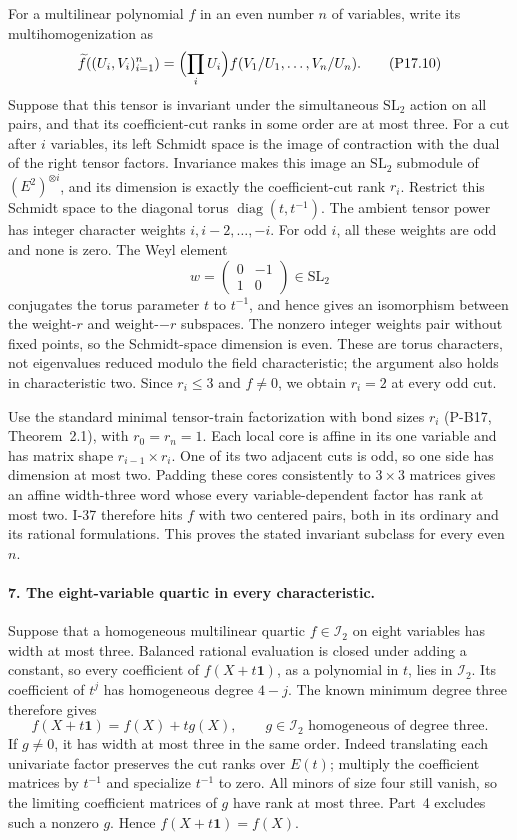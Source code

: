 For a multilinear polynomial $f$ in an even number $n$ of variables,
write its multihomogenization as
\[
 \widetilde f((U_i,V_i)_{i=1}^n)
   =\Bigl(\prod_i U_i\Bigr)f(V_1/U_1,\ldots,V_n/U_n).
 \tag{P17.10}
\]
Suppose that this tensor is invariant under the simultaneous
$\mathrm{SL}_2$ action on all pairs, and that its coefficient-cut
ranks in some order are at most three. For a cut after $i$
variables, its left Schmidt space is the image of contraction
with the dual of the right tensor factors. Invariance makes
this image an $\mathrm{SL}_2$ submodule of $(E^2)^{\otimes i}$,
and its dimension is exactly the coefficient-cut rank $r_i$.
Restrict this Schmidt space to the diagonal torus
$\operatorname{diag}(t,t^{-1})$. The ambient tensor power has
integer character weights $i,i-2,\ldots,-i$. For odd $i$, all
these weights are odd and none is zero. The Weyl element
\[
 w=\begin{pmatrix}0&-1\\1&0\end{pmatrix}\in\mathrm{SL}_2
\]
conjugates the torus parameter $t$ to $t^{-1}$, and hence gives
an isomorphism between the weight-$r$ and weight-$-r$ subspaces.
The nonzero integer weights pair without fixed points, so the
Schmidt-space dimension is even. These are torus characters,
not eigenvalues reduced modulo the field characteristic; the
argument also holds in characteristic two. Since $r_i\le3$
and $f\ne0$, we obtain $r_i=2$ at every odd cut.

Use the standard minimal tensor-train factorization with bond
sizes $r_i$ (P-B17, Theorem~2.1), with $r_0=r_n=1$.
Each local core is affine in its one variable and has matrix
shape $r_{i-1}\times r_i$. One of its two adjacent cuts is odd,
so one side has dimension at most two. Padding these cores
consistently to $3\times3$ matrices gives an affine width-three
word whose every variable-dependent factor has rank at most
two. I-37 therefore hits $f$ with two centered pairs, both in
its ordinary and its rational formulations. This proves the
stated invariant subclass for every even $n$.

\paragraph{7. The eight-variable quartic in every characteristic.}
Suppose that a homogeneous multilinear quartic $f\in\mathcal I_2$
on eight variables has width at most three. Balanced rational
evaluation is closed under adding a constant, so every coefficient
of $f(X+t\mathbf1)$, as a polynomial in $t$, lies in
$\mathcal I_2$. Its coefficient of $t^j$ has homogeneous degree
$4-j$. The known minimum degree three therefore gives
\[
 f(X+t\mathbf1)=f(X)+t g(X),\qquad
 g\in\mathcal I_2\text{ homogeneous of degree three}.
 \tag{P17.11}
\]
If $g\ne0$, it has width at most three in the same order.
Indeed translating each univariate factor preserves the cut
ranks over $E(t)$; multiply the coefficient matrices by $t^{-1}$
and specialize $t^{-1}$ to zero. All minors of size four still
vanish, so the limiting coefficient matrices of $g$ have rank
at most three. Part~4 excludes such a nonzero $g$. Hence
$f(X+t\mathbf1)=f(X)$.

